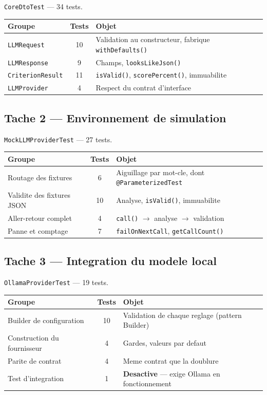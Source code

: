\documentclass[12pt,a4paper]{article}
\begin{document}
\texttt{CoreDtoTest} --- 34 tests.

\begin{center}
\begin{tabular}{lcl}
\toprule
\textbf{Groupe} & \textbf{Tests} & \textbf{Objet} \\
\midrule
\texttt{LLMRequest}  & 10 & Validation au constructeur, fabrique \texttt{withDefaults()} \\
\texttt{LLMResponse} &  9 & Champs, \texttt{looksLikeJson()} \\
\texttt{CriterionResult} & 11 & \texttt{isValid()}, \texttt{scorePercent()}, immuabilite \\
\texttt{LLMProvider} &  4 & Respect du contrat d'interface \\
\bottomrule
\end{tabular}
\end{center}

\subsection{Tache 2 --- Environnement de simulation}

\texttt{MockLLMProviderTest} --- 27 tests.

\begin{center}
\begin{tabular}{lcl}
\toprule
\textbf{Groupe} & \textbf{Tests} & \textbf{Objet} \\
\midrule
Routage des fixtures & 6 & Aiguillage par mot-cle, dont \texttt{@ParameterizedTest} \\
Validite des fixtures JSON & 10 & Analyse, \texttt{isValid()}, immuabilite \\
Aller-retour complet & 4 & \texttt{call()} $\rightarrow$ analyse $\rightarrow$ validation \\
Panne et comptage & 7 & \texttt{failOnNextCall}, \texttt{getCallCount()} \\
\bottomrule
\end{tabular}
\end{center}

\subsection{Tache 3 --- Integration du modele local}

\texttt{OllamaProviderTest} --- 19 tests.

\begin{center}
\begin{tabular}{lcl}
\toprule
\textbf{Groupe} & \textbf{Tests} & \textbf{Objet} \\
\midrule
Builder de configuration & 10 & Validation de chaque reglage (pattern Builder) \\
Construction du fournisseur & 4 & Gardes, valeurs par defaut \\
Parite de contrat & 4 & Meme contrat que la doublure \\
Test d'integration & 1 & \textbf{Desactive} --- exige Ollama en fonctionnement \\
\bottomrule
\end{tabular}
\end{center}
\end{document}
